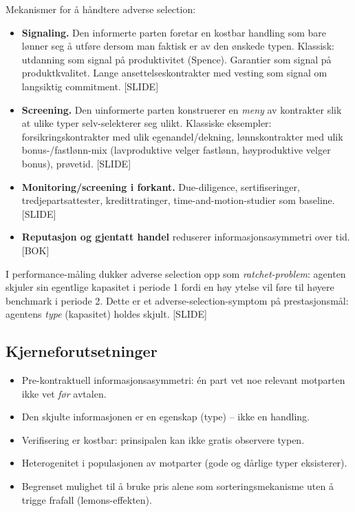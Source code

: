Mekanismer for å håndtere adverse selection:
\begin{itemize}\setlength{\itemsep}{2pt}
\item \textbf{Signaling.} Den informerte parten foretar en kostbar handling som bare lønner seg å utføre dersom man faktisk er av den ønskede typen. Klassisk: utdanning som signal på produktivitet (Spence). Garantier som signal på produktkvalitet. Lange ansettelseskontrakter med vesting som signal om langsiktig commitment. [SLIDE]
\item \textbf{Screening.} Den uinformerte parten konstruerer en \emph{meny} av kontrakter slik at ulike typer selv-selekterer seg ulikt. Klassiske eksempler: forsikringskontrakter med ulik egenandel/dekning, lønnskontrakter med ulik bonus-/fastlønn-mix (lavproduktive velger fastlønn, høyproduktive velger bonus), prøvetid. [SLIDE]
\item \textbf{Monitoring/screening i forkant.} Due-diligence, sertifiseringer, tredjepartsattester, kredittratinger, time-and-motion-studier som baseline. [SLIDE]
\item \textbf{Reputasjon og gjentatt handel} reduserer informasjonsasymmetri over tid. [BOK]
\end{itemize}

I performance-måling dukker adverse selection opp som \emph{ratchet-problem}: agenten skjuler sin egentlige kapasitet i periode 1 fordi en høy ytelse vil føre til høyere benchmark i periode 2. Dette er et adverse-selection-symptom på prestasjonsmål: agentens \emph{type} (kapasitet) holdes skjult. [SLIDE]

\subsection*{Kjerneforutsetninger}
\begin{itemize}
\item Pre-kontraktuell informasjonsasymmetri: én part vet noe relevant motparten ikke vet \emph{før} avtalen.
\item Den skjulte informasjonen er en egenskap (type) -- ikke en handling.
\item Verifisering er kostbar: prinsipalen kan ikke gratis observere typen.
\item Heterogenitet i populasjonen av motparter (gode og dårlige typer eksisterer).
\item Begrenset mulighet til å bruke pris alene som sorteringsmekanisme uten å trigge frafall (lemons-effekten).
\end{itemize}

